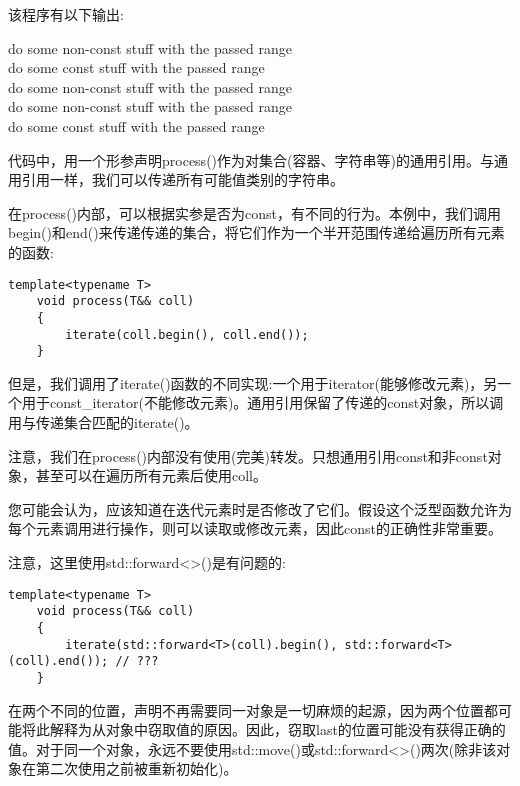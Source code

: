 该程序有以下输出:\par

\begin{tcolorbox}[colback=white,colframe=black]
do some non-const stuff with the passed range \\
do some const stuff with the passed range \\
do some non-const stuff with the passed range \\
do some non-const stuff with the passed range \\
do some const stuff with the passed range
\end{tcolorbox}

代码中，用一个形参声明process()作为对集合(容器、字符串等)的通用引用。与通用引用一样，我们可以传递所有可能值类别的字符串。\par

在process()内部，可以根据实参是否为const，有不同的行为。本例中，我们调用begin()和end()来传递传递的集合，将它们作为一个半开范围传递给遍历所有元素的函数:\par

\begin{lstlisting}[caption={}]
	template<typename T>
	void process(T&& coll)
	{
		iterate(coll.begin(), coll.end());
	}
\end{lstlisting}

但是，我们调用了iterate()函数的不同实现:一个用于iterator(能够修改元素)，另一个用于const\_iterator(不能修改元素)。通用引用保留了传递的const对象，所以调用与传递集合匹配的iterate()。\par

注意，我们在process()内部没有使用(完美)转发。只想通用引用const和非const对象，甚至可以在遍历所有元素后使用coll。\par

您可能会认为，应该知道在迭代元素时是否修改了它们。假设这个泛型函数允许为每个元素调用进行操作，则可以读取或修改元素，因此const的正确性非常重要。\par

注意，这里使用std::forward<>()是有问题的:\par

\begin{lstlisting}[caption={}]
	template<typename T>
	void process(T&& coll)
	{
		iterate(std::forward<T>(coll).begin(), std::forward<T>(coll).end()); // ???
	}
\end{lstlisting}

在两个不同的位置，声明不再需要同一对象是一切麻烦的起源，因为两个位置都可能将此解释为从对象中窃取值的原因。因此，窃取last的位置可能没有获得正确的值。对于同一个对象，永远不要使用std::move()或std::forward<>()两次(除非该对象在第二次使用之前被重新初始化)。\par

